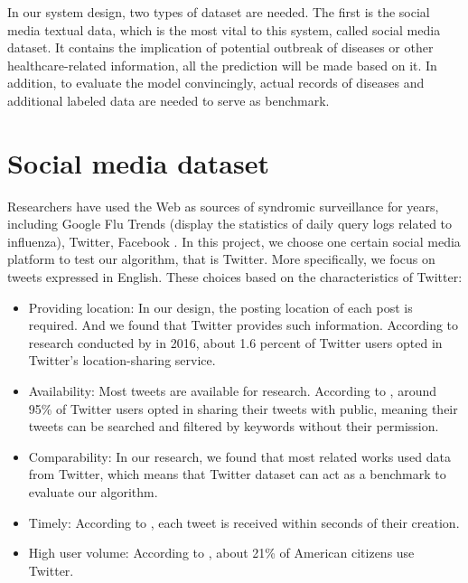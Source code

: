 In our system design, two types of dataset are needed. The first is the social media textual data, which is the most vital to this system, called social media dataset. It contains the implication of potential outbreak of diseases or other healthcare-related information, all the prediction will be made based on it. In addition, to evaluate the model convincingly, actual records of diseases and additional labeled data are needed to serve as benchmark. 
\section{Social media dataset}
\label{sec:Social media dataset}
Researchers have used the Web as sources of syndromic surveillance for years, including Google Flu Trends (display the statistics of daily query logs related to influenza), Twitter, Facebook \cite{paul2011you}. 
In this project, we choose one certain social media platform to test our algorithm, that is Twitter. More specifically, we focus on tweets expressed in English. These choices based on the characteristics of Twitter:
\begin{itemize}
    \item Providing location: In our design, the posting location of each post is required. And we found that Twitter provides such information. According to research conducted by \cite{greenwood2016social} in 2016, about 1.6 percent of Twitter users opted in Twitter's location-sharing service.
    \item Availability: Most tweets are available for research. According to \cite{serban2019real}, around 95\% of Twitter users opted in sharing their tweets with public, meaning their tweets can be searched and filtered by keywords without their permission.  
    \item Comparability: In our research, we found that most related works used data from Twitter, which means that Twitter dataset can act as a benchmark to evaluate our algorithm.
    \item Timely: According to \cite{serban2019real}, each tweet is received within seconds of their creation.
    \item High user volume: According to \cite{greenwood2016social}, about 21\% of American citizens use Twitter.
\end{itemize} 


